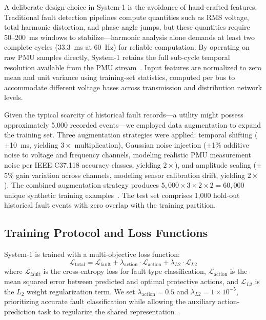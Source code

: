 \documentclass[journal]{IEEEtran}
\begin{document}
A deliberate design choice in System-1 is the avoidance of hand-crafted features. Traditional fault detection pipelines compute quantities such as RMS voltage, total harmonic distortion, and phase angle jumps, but these quantities require 50--200~ms windows to stabilize---harmonic analysis alone demands at least two complete cycles (33.3~ms at 60~Hz) for reliable computation. By operating on raw PMU samples directly, System-1 retains the full sub-cycle temporal resolution available from the PMU stream~\cite{ref5}. Input features are normalized to zero mean and unit variance using training-set statistics, computed per bus to accommodate different voltage bases across transmission and distribution network levels.

Given the typical scarcity of historical fault records---a utility might possess approximately 5,000 recorded events---we employed data augmentation to expand the training set. Three augmentation strategies were applied: temporal shifting ($\pm$10~ms, yielding $3\times$ multiplication), Gaussian noise injection ($\pm$1\% additive noise to voltage and frequency channels, modeling realistic PMU measurement noise per IEEE C37.118 accuracy classes, yielding $2\times$), and amplitude scaling ($\pm$5\% gain variation across channels, modeling sensor calibration drift, yielding $2\times$). The combined augmentation strategy produces $5,000 \times 3 \times 2 \times 2 = 60,000$ unique synthetic training examples~\cite{ref27}. The test set comprises 1,000 hold-out historical fault events with zero overlap with the training partition.

\subsection{Training Protocol and Loss Functions}

System-1 is trained with a multi-objective loss function:
\begin{equation}
\mathcal{L}_{\text{total}} = \mathcal{L}_{\text{fault}} + \lambda_{\text{action}} \cdot \mathcal{L}_{\text{action}} + \lambda_{L2} \cdot \mathcal{L}_{L2}
\end{equation}
where $\mathcal{L}_{\text{fault}}$ is the cross-entropy loss for fault type classification, $\mathcal{L}_{\text{action}}$ is the mean squared error between predicted and optimal protective actions, and $\mathcal{L}_{L2}$ is the $L_2$ weight regularization term. We set $\lambda_{\text{action}} = 0.5$ and $\lambda_{L2} = 1\!\times\!10^{-5}$, prioritizing accurate fault classification while allowing the auxiliary action-prediction task to regularize the shared representation~\cite{ref28}.
\end{document}
